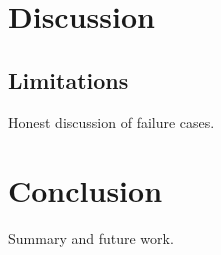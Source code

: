 
\section{Discussion}
\subsection{Limitations}
Honest discussion of failure cases.

\section{Conclusion}
Summary and future work.
